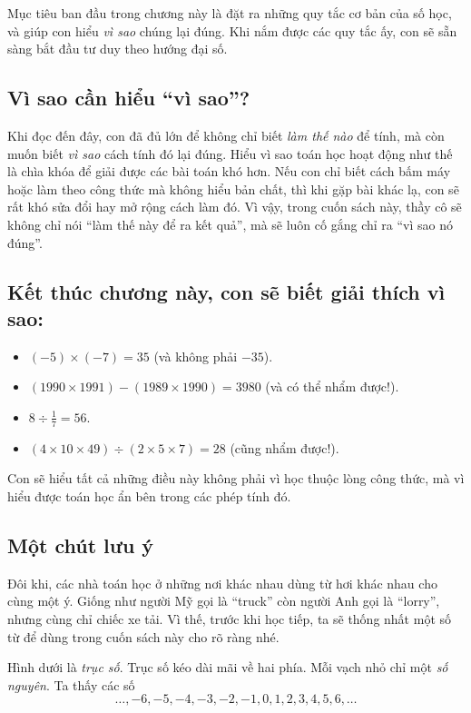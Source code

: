 Mục tiêu ban đầu trong chương này là đặt ra những quy tắc cơ bản của
số học, và giúp con hiểu \emph{vì sao} chúng lại đúng. Khi nắm được
các quy tắc ấy, con sẽ sẵn sàng bắt đầu tư duy theo hướng đại số.

\subsection*{Vì sao cần hiểu “vì sao”?}
Khi đọc đến đây, con đã đủ lớn để không chỉ biết \emph{làm thế nào}
để tính, mà còn muốn biết \emph{vì sao} cách tính đó lại đúng. Hiểu
vì sao toán học hoạt động như thế là chìa khóa để giải được các bài
toán khó hơn. Nếu con chỉ biết cách bấm máy hoặc làm theo công thức mà
không hiểu bản chất, thì khi gặp bài khác lạ, con sẽ rất khó sửa đổi
hay mở rộng cách làm đó. Vì vậy, trong cuốn sách này, thầy cô sẽ không
chỉ nói “làm thế này để ra kết quả”, mà sẽ luôn cố gắng chỉ ra “vì sao
nó đúng”.

\subsection*{Kết thúc chương này, con sẽ biết giải thích vì sao:}
\begin{itemize}
  \item $(-5)\times(-7)=35$ (và không phải $-35$).
  \item $(1990\times1991)-(1989\times1990)=3980$ (và có thể nhẩm được!).
  \item $8\div\tfrac{1}{7}=56$.
  \item $(4\times10\times49)\div(2\times5\times7)=28$ (cũng nhẩm được!).
\end{itemize}

Con sẽ hiểu tất cả những điều này không phải vì học thuộc lòng công
thức, mà vì hiểu được toán học ẩn bên trong các phép tính đó.

\subsection*{Một chút lưu ý}
Đôi khi, các nhà toán học ở những nơi khác nhau dùng từ hơi khác nhau
cho cùng một ý. Giống như người Mỹ gọi là “truck” còn người Anh gọi là
“lorry”, nhưng cùng chỉ chiếc xe tải. Vì thế, trước khi học tiếp, ta
sẽ thống nhất một số từ để dùng trong cuốn sách này cho rõ ràng nhé.


Hình dưới là \emph{trục số}. Trục số kéo dài mãi về hai phía.
Mỗi vạch nhỏ chỉ một \emph{số nguyên}. Ta thấy các số
\[
\ldots,-6,-5,-4,-3,-2,-1,0,1,2,3,4,5,6,\ldots
\]

